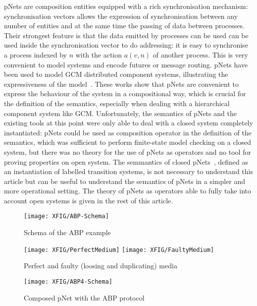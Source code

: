 \documentclass{lncs/llncs}
\newcommand{\TODO}[1]{\textcolor{red}{\textbf{[TODO:#1]}}}
\begin{document}
pNets are composition entities equipped with a rich synchronisation mechanism: synchronisation vectors allows the expression of synchronisation between any number of entities and at the same time the passing of data between processes. Their strongest feature is that the data emitted by processes can be used can be used inside the synchronisation vector to do addressing: it is easy to synchronise a process indexed by $n$ with the action $a(v,n)$ of another process. This is very convenient to model systems and encode futures or message routing. pNets have been used to model GCM distributed component systems, illustrating the expressiveness of the model~\cite{AmeurBoulifa2017}. These works show that pNets are convenient to express the behaviour of the system in a compositional way, which is crucial for the definition of the semantics, especially when dealing with a hierarchical component system like GCM. Unfortunately, the semantics of pNets and the existing tools at this point were only able to deal with a closed system completely instantiated: pNets could be used as composition operator in the definition of the semantics, which was sufficient to perform finite-state model checking on a closed system, but there was no theory for the use of pNets as operators and no tool for proving properties on open system. The semmantics of closed pNets~\cite{AmeurBoulifa2017}, defined as an instantiation of labelled transition systems, is not necessary to understand this article but can be useful to  understand the semantics of pNets in a simpler and more operational setting. The theory of pNets as operators able to fully take into account open systems is given in the rest of this article.

\begin{figure}[t]
  \centerline{
   \texttt{[image: XFIG/ABP-Schema]}
   }
   \caption{Schema of the ABP example}  \label{ABP:Schema}
\end{figure}

  
\begin{figure}[t]


  \centerline{
   \texttt{[image: XFIG/PerfectMedium]}
   \hspace{0.5cm}
   \texttt{[image: XFIG/FaultyMedium]}
   }
   \caption{Perfect and faulty (loosing and duplicating) media}  \label{schema:ABP-media}

  \vspace{1cm}
  \centerline{\texttt{[image: XFIG/ABP4-Schema]}}
  \caption{Composed pNet with the ABP protocol}  \label{schema:ABP-composed}

\end{figure}
\end{document}
